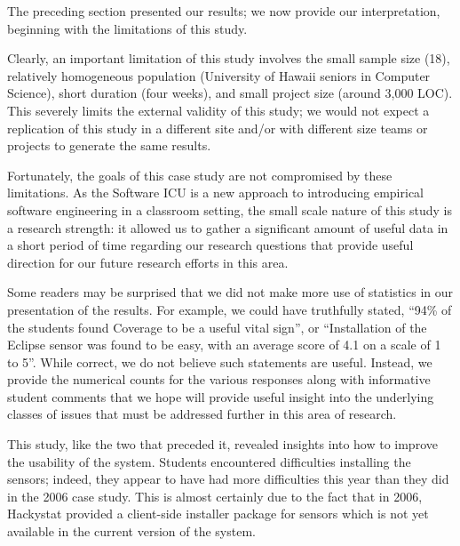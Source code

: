 \documentclass[10pt,twocolumn]{article}
\begin{document}


\label{sec:discussion}

The preceding section presented our results; we now provide our interpretation, beginning with the limitations of this study.


Clearly, an important limitation of this study involves the small sample
size (18), relatively homogeneous population (University of Hawaii seniors
in Computer Science), short duration (four weeks), and small project size
(around 3,000 LOC).  This severely limits the external validity of this
study; we would not expect a replication of this study in a different site
and/or with different size teams or projects to generate the same results.

Fortunately, the goals of this case study are not compromised by these
limitations.  As the Software ICU is a new approach to introducing
empirical software engineering in a classroom setting, the small scale nature
of this study is a research strength: it allowed us to gather a significant
amount of useful data in a short period of time regarding our research
questions that provide useful direction for our future research efforts in
this area.

Some readers may be surprised that we did not make more use of statistics
in our presentation of the results.  For example, we could have truthfully
stated, ``94\% of the students found Coverage to be a useful vital sign'',
or ``Installation of the Eclipse sensor was found to be easy, with an
average score of 4.1 on a scale of 1 to 5''.  While correct, we do not
believe such statements are useful. Instead, we provide the numerical
counts for the various responses along with informative student comments
that we hope will provide useful insight into the underlying classes of
issues that must be addressed further in this area of research.


This study, like the two that preceded it, revealed insights into how to
improve the usability of the system.  Students encountered difficulties
installing the sensors; indeed, they appear to have had more difficulties
this year than they did in the 2006 case study.  This is almost certainly
due to the fact that in 2006, Hackystat provided a client-side installer
package for sensors which is not yet available in the current version of
the system.
\end{document}
